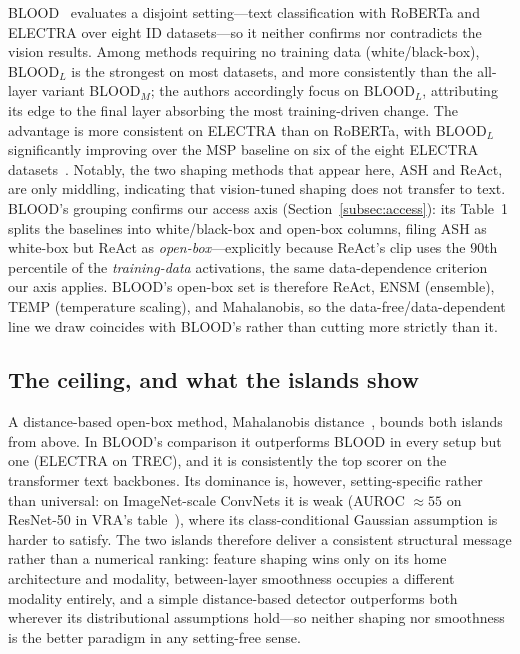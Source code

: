 \documentclass[a4paper]{article}
\begin{document}
BLOOD~\citep{blood} evaluates a disjoint setting---text classification with RoBERTa and
ELECTRA over eight ID datasets---so it neither confirms nor contradicts the vision
results. Among methods requiring no training data (white/black-box), BLOOD$_L$ is the
strongest on most datasets, and more consistently than the all-layer variant BLOOD$_M$;
the authors accordingly focus on BLOOD$_L$, attributing its edge to the final layer
absorbing the most training-driven change. The advantage is more consistent on ELECTRA than on RoBERTa, with BLOOD$_L$
significantly improving over the MSP baseline on six of the eight ELECTRA
datasets~\citep{blood}. Notably, the two shaping methods that appear here, ASH and
ReAct, are only middling, indicating that vision-tuned shaping does not transfer to
text. BLOOD's grouping confirms our access axis (Section~\ref{subsec:access}): its Table~1
splits the baselines into white/black-box and open-box columns, filing ASH as
white-box but ReAct as \emph{open-box}---explicitly because ReAct's clip uses the
$90$th percentile of the \emph{training-data} activations, the same data-dependence
criterion our axis applies. BLOOD's open-box set is therefore
ReAct, ENSM (ensemble), TEMP (temperature scaling), and Mahalanobis, so the
data-free/data-dependent line we draw
coincides with BLOOD's rather than cutting more strictly than it.

\subsection{The ceiling, and what the islands show}
\label{subsec:exp-ceiling}

A distance-based open-box method, Mahalanobis distance~\citep{mahalanobis}, bounds both
islands from above. In BLOOD's comparison it outperforms BLOOD in every setup but one
(ELECTRA on TREC), and it is consistently the top scorer on the transformer text
backbones. Its dominance is, however, setting-specific rather than universal: on
ImageNet-scale ConvNets it is weak (AUROC $\approx 55$ on ResNet-50 in VRA's
table~\citep{vra}), where its class-conditional Gaussian assumption is harder to
satisfy. The two islands therefore deliver a consistent structural message rather than
a numerical ranking: feature shaping wins only on its home architecture and modality,
between-layer smoothness occupies a different modality entirely, and a simple
distance-based detector outperforms both wherever its distributional assumptions
hold---so neither shaping nor smoothness is the better paradigm in any setting-free
sense.
\end{document}
